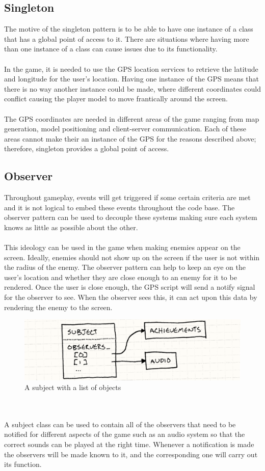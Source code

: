 \documentclass[a4paper]{report}
\begin{document}
\subsection{Singleton}
The motive of the singleton pattern is to be able to have one instance of a class that has a global point of access to it. There are situations where having more than one instance of a class can cause issues due to its functionality. 
\\\\
In the game, it is needed to use the GPS location services to retrieve the latitude and longitude for the user's location. Having one instance of the GPS means that there is no way another instance could be made, where different coordinates could conflict causing the player model to move frantically around the screen. \cite{GOF}
\\\\
The GPS coordinates are needed in different areas of the game ranging from map generation, model positioning and client-server communication. Each of these areas cannot make their an instance of the GPS for the reasons described above; therefore, singleton provides a global point of access. \cite{GPP}

\subsection{Observer}
Throughout gameplay, events will get triggered if some certain criteria are met and it is not logical to embed these events throughout the code base. The observer pattern can be used to decouple these systems making sure each system knows as little as possible about the other. 
\\\\
This ideology can be used in the game when making enemies appear on the screen. Ideally, enemies should not show up on the screen if the user is not within the radius of the enemy. The observer pattern can help to keep an eye on the user’s location and whether they are close enough to an enemy for it to be rendered. Once the user is close enough, the GPS script will send a notify signal for the observer to see. When the observer sees this, it can act upon this data by rendering the enemy to the screen.
\begin{figure}[h]
\centering
\includegraphics[scale=0.55]{observer-list}
\caption{A subject with a list of objects \cite{GPP}}
\end{figure}
\\\\
A subject class can be used to contain all of the observers that need to be notified for different aspects of the game such as an audio system so that the correct sounds can be played at the right time. Whenever a notification is made the observers will be made known to it, and the corresponding one will carry out its function. \cite{GPP}
\end{document}
